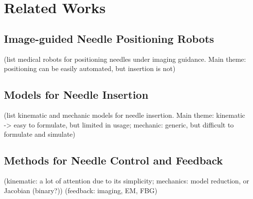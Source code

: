 \chapter{Related Works} \label{chap:chap-2}

\section{Image-guided Needle Positioning Robots}
\label{sec:image_guided_needle_positioning_robots}

(list medical robots for positioning needles under imaging guidance. Main theme: positioning can be easily automated, but insertion is not)

\section{Models for Needle Insertion}
\label{sec:models_for_needle_insertion}

(list kinematic and mechanic models for needle insertion. Main theme: kinematic -> easy to formulate, but limited in usage; mechanic: generic, but difficult to formulate and simulate)

\section{Methods for Needle Control and Feedback}
\label{sec:methods_for_needle_control_and_Feedback}

(kinematic: a lot of attention due to its simplicity; mechanics: model reduction, or Jacobian (binary?)) (feedback: imaging, EM, FBG)

